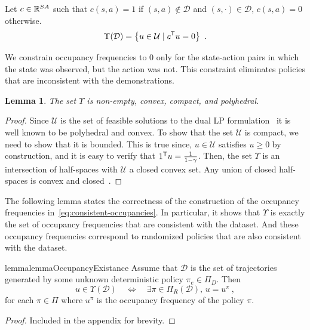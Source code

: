 \documentclass[10pt]{article}
\renewcommand{\cite}{\citep}
\newtheorem{lemma}{Lemma}
\begin{document}
Let $c \in \mathbb{R}^{SA}$ such that $c(s,a) = 1$ if $(s,a) \notin \mathcal{D}$ and $(s, \cdot) \in \mathcal{D}$, $c(s,a)  = 0$ otherwise.
%
\begin{equation}\label{eq:consistent-occupancies}
	\Upsilon(\mathcal{D}) = \left\{ u \in \mathcal{U} \mid c^{\mathsf{T}} u = 0  \right\}~.
\end{equation}


We constrain occupancy frequencies to 0 only for the state-action pairs in which the state was observed, but the action was not. This constraint eliminates policies that are inconsistent with the demonstrations.
%
\begin{lemma}\label{prop:convexity_of_Upsilon}
The set $\Upsilon$ is non-empty, convex, compact, and polyhedral.
\end{lemma}
\begin{proof}
Since $\mathcal{U}$ is the set of feasible solutions to the dual LP formulation~\cite[Eq.~(6.9.2)]{Puterman1994} it is well known to be polyhedral and convex. To show that the set $\mathcal{U}$ is compact, we need to show that it is bounded. This is true since, $u \in \mathcal{U}$ satisfies $u \ge 0$ by construction, and it is easy to verify that $1^{\mathsf{T}} u = \frac{1}{1-\gamma}$. Then, the set $\Upsilon$ is an intersection of half-spaces with $\mathcal{U}$ a closed convex set. Any union of closed half-spaces is convex and closed~\cite[eq.~(2.2.1)]{boyd_convex_optimization}.
\end{proof}

The following lemma states the correctness of the construction of the occupancy frequencies in~\eqref{eq:consistent-occupancies}. In particular, it shows that $\Upsilon$ is exactly the set of occupancy frequencies that are consistent with the dataset. And these occupancy frequencies correspond to randomized policies that are also consistent with the dataset.

\begin{restatable}{lemma}{lemmaOccupancyExistance}
\label{lemma:occ_freq_matching}
    	Assume that $\mathcal{D}$ is the set of trajectories generated by some unknown deterministic policy $\pi_e \in \Pi_D$. Then
	\[
		u \in \Upsilon(\mathcal{D})  \quad \Leftrightarrow \quad  \exists \pi \in \Pi_R(\mathcal{D}), \, u = u^{\pi}~,
	\]
	for each $\pi \in \Pi$ where $u^{\pi}$ is the occupancy frequency of the policy $\pi$.
\end{restatable}
\begin{proof}
	Included in the appendix for brevity.
\end{proof}
\end{document}
